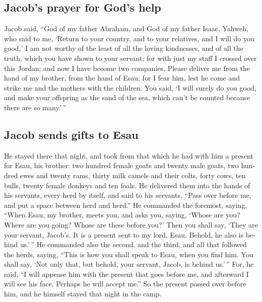 \begin{paracol}{2}
\begin{otherlanguage}{english}
\hypertarget{jacobs-prayer-for-gods-help}{%
\subsection{Jacob's prayer for God's
help}\label{jacobs-prayer-for-gods-help}}

 Jacob said, ``God of my father Abraham, and God of my
father Isaac, Yahweh, who said to me, `Return to your country, and to
your relatives, and I will do you good,'  I am not worthy
of the least of all the loving kindnesses, and of all the truth, which
you have shown to your servant; for with just my staff I crossed over
this Jordan; and now I have become two companies.  Please
deliver me from the hand of my brother, from the hand of Esau; for I
fear him, lest he come and strike me and the mothers with the children.
 You said, `I will surely do you good, and make your
offspring as the sand of the sea, which can't be counted because there
are so many.'\,''

\hypertarget{jacob-sends-gifts-to-esau}{%
\subsection{Jacob sends gifts to Esau}\label{jacob-sends-gifts-to-esau}}

 He stayed there that night, and took from that which he
had with him a present for Esau, his brother:  two
hundred female goats and twenty male goats, two hundred ewes and twenty
rams,  thirty milk camels and their colts, forty cows,
ten bulls, twenty female donkeys and ten foals.  He
delivered them into the hands of his servants, every herd by itself, and
said to his servants, ``Pass over before me, and put a space between
herd and herd.''  He commanded the foremost, saying,
``When Esau, my brother, meets you, and asks you, saying, `Whose are
you? Where are you going? Whose are these before you?' 
Then you shall say, `They are your servant, Jacob's. It is a present
sent to my lord, Esau. Behold, he also is behind us.'\,''
 He commanded also the second, and the third, and all
that followed the herds, saying, ``This is how you shall speak to Esau,
when you find him.  You shall say, `Not only that, but
behold, your servant, Jacob, is behind us.'\,'' For, he said, ``I will
appease him with the present that goes before me, and afterward I will
see his face. Perhaps he will accept me.''  So the
present passed over before him, and he himself stayed that night in the
camp.


\end{otherlanguage}
\end{paracol}
